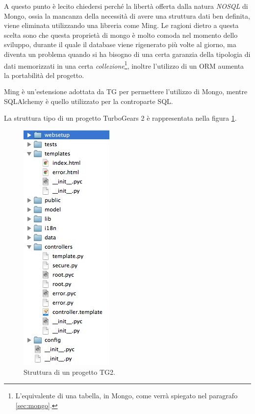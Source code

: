 A questo punto è lecito chiedersi perché la libertà offerta dalla natura \emph{NOSQL} di Mongo, ossia la mancanza della necessità di avere una struttura dati ben definita, viene eliminata utilizzando una libreria come Ming. Le ragioni dietro a questa scelta sono che questa proprietà di mongo è molto comoda nel momento dello sviluppo, durante il quale il database viene rigenerato più volte al giorno, ma diventa un problema quando si ha bisogno di una certa garanzia della tipologia di dati memorizzati in una certa \emph{collezione}\footnote{L'equivalente di una tabella, in Mongo, come verrà spiegato nel paragrafo \ref{sec:mongo}.}, inoltre l'utilizzo di un ORM aumenta la portabilità del progetto.

Ming è un'estensione adottata da TG per permettere l'utilizzo di Mongo, mentre SQLAlchemy è quello utilizzato per la controparte SQL.

La struttura tipo di un progetto TurboGears 2 è rappresentata nella figura \ref{fig:progetto}.
\begin{figure}[ht!]
	\caption{Struttura di un progetto TG2.}
	\label{fig:progetto}
	\centering
	\includegraphics{img/tg2project.jpg}
\end{figure}

